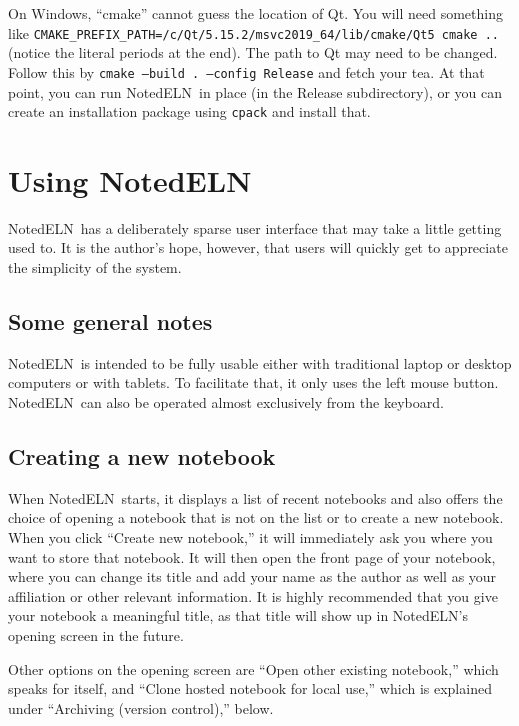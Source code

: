 \documentclass[11pt]{report}
\def\terminal#1{{\tt#1}}
\newcommand{\NotedELN}{NotedELN} %
\begin{document}
On Windows, ``cmake'' cannot guess the location of Qt. You will need
something like
\terminal{CMAKE\_PREFIX\_PATH=/c/Qt/5.15.2/msvc2019\_64/lib/cmake/Qt5
  cmake ..} (notice the literal periods at the end).  The path to Qt
may need to be changed. Follow this by \terminal{cmake --build . --config
  Release} and fetch your tea. At that point, you can run \NotedELN\ in place (in the
Release subdirectory), or you can create an installation package using
\terminal{cpack} and install that.

\chapter{Using \NotedELN}

\NotedELN\ has a deliberately sparse user interface that may take a little
getting used to. It is the author's hope, however, that users will
quickly get to appreciate the simplicity of the system.

\section{Some general notes}

\NotedELN\ is intended to be fully usable either with traditional laptop or
desktop computers or with tablets. To facilitate that, it only uses
the left mouse button. \NotedELN\ can also be operated almost exclusively from the
keyboard.

\section{Creating a new notebook}

When \NotedELN\ starts, it displays a list of recent notebooks and also offers the
choice of opening a notebook that is not on the list or to create a
new notebook. When you click ``Create new notebook,'' it will
immediately ask you where you want to store that notebook. It will
then open the front page of your notebook, where you can change its
title and add your name as the author as well as your affiliation or
other relevant information. It is highly recommended that you give
your notebook a meaningful title, as that title will show up in \NotedELN's
opening screen in the future.

Other options on the opening screen are ``Open other existing
notebook,'' which speaks for itself, and ``Clone hosted notebook for
local use,'' which is explained under ``Archiving (version control),''
below.
\end{document}
